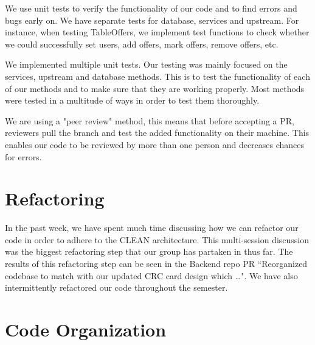 \documentclass[fontsize=14pt]{article}
\begin{document}
\noindent
We use unit tests to verify the functionality of our code and to find errors and bugs early on. We have separate tests for database, services and upstream. For instance, when testing TableOffers, we implement test functions to check whether we could successfully set users, add offers, mark offers, remove offers, etc.

We implemented multiple unit tests. Our testing was mainly focused on the services, upstream and database methods. This is to test the functionality of each of our methods and to make sure that they are working properly. Most methods were tested in a multitude of ways in order to test them thoroughly.

\noindent
We are using a "peer review" method, this means that before accepting a PR, reviewers pull the branch and test the added functionality on their machine. This enables our code to be reviewed by more than one person and decreases chances for errors.

\section*{Refactoring}

In the past week, we have spent much time discussing how we can refactor our code in order to adhere to the CLEAN architecture. This multi-session discussion was the biggest refactoring step that our group has partaken in thus far. The results of this refactoring step can be seen in the Backend repo PR ``Reorganized codebase to match with our updated CRC card design which …". We have also intermittently refactored our code throughout the semester.  

\section*{Code Organization}
\end{document}

